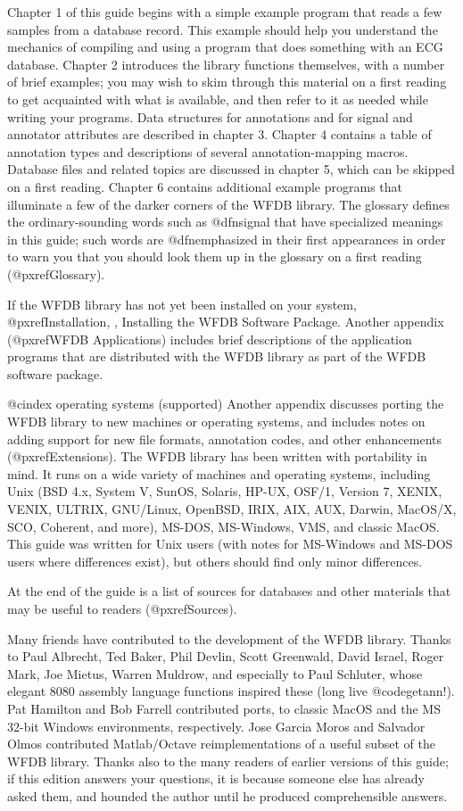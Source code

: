 Chapter 1 of this guide begins with a simple example program that reads
a few samples from a database record.  This example should help you
understand the mechanics of compiling and using a program that does
something with an ECG database.  Chapter 2 introduces the library
functions themselves, with a number of brief examples; you may wish to
skim through this material on a first reading to get acquainted with
what is available, and then refer to it as needed while writing your
programs.  Data structures for annotations and for signal and annotator
attributes are described in chapter 3.  Chapter 4 contains a table of
annotation types and descriptions of several annotation-mapping macros.
Database files and related topics are discussed in chapter 5, which can
be skipped on a first reading.  Chapter 6 contains additional example
programs that illuminate a few of the darker corners of the WFDB library.
The glossary defines the ordinary-sounding words such as @dfn{signal}
that have specialized meanings in this guide; such words are
@dfn{emphasized} in their first appearances in order to warn you that
you should look them up in the glossary on a first reading
(@pxref{Glossary}).

If the WFDB library has not yet been installed on your system,
@pxref{Installation, , Installing the WFDB Software Package}.
Another appendix (@pxref{WFDB Applications}) includes brief
descriptions of the application programs that are distributed with the
WFDB library as part of the WFDB software package.

@cindex operating systems (supported)
Another appendix discusses porting the WFDB library to new machines or
operating systems, and includes notes on adding support for new file
formats, annotation codes, and other enhancements (@pxref{Extensions}).
The WFDB library has been written with portability in mind.  It runs on
a wide variety of machines and operating systems, including Unix (BSD
4.x, System V, SunOS, Solaris, HP-UX, OSF/1, Version 7, XENIX, VENIX,
ULTRIX, GNU/Linux, OpenBSD, IRIX, AIX, AUX, Darwin, MacOS/X, SCO,
Coherent, and more), MS-DOS, MS-Windows, VMS, and classic MacOS.
This guide was written for Unix users (with notes for MS-Windows and
MS-DOS users where differences exist), but others should find only minor
differences.

At the end of the guide is a list of sources for databases and other
materials that may be useful to readers (@pxref{Sources}).

Many friends have contributed to the development of the WFDB library.  Thanks
to Paul Albrecht, Ted Baker, Phil Devlin, Scott Greenwald, David Israel, Roger
Mark, Joe Mietus, Warren Muldrow, and especially to Paul Schluter, whose
elegant 8080 assembly language functions inspired these (long live
@code{getann}!).  Pat Hamilton and Bob Farrell contributed ports, to classic
MacOS and the MS 32-bit Windows environments, respectively.  Jose Garcia
Moros and Salvador Olmos contributed Matlab/Octave reimplementations of a
useful subset of the WFDB library.  Thanks also to the many readers of earlier
versions of this guide; if this edition answers your questions, it is because
someone else has already asked them, and hounded the author until he produced
comprehensible answers.

